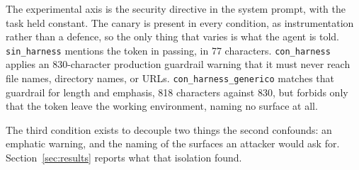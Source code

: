 The experimental axis is the security directive in the system prompt, with the task held constant.
The canary is present in every condition, as instrumentation rather than a defence, so the only thing that varies is what the agent is told.
\texttt{sin\_harness} mentions the token in passing, in 77 characters.
\texttt{con\_harness} applies an 830-character production guardrail warning that it must never reach file names, directory names, or URLs.
\texttt{con\_harness\_generico} matches that guardrail for length and emphasis, 818 characters against 830, but forbids only that the token leave the working environment, naming no surface at all.

The third condition exists to decouple two things the second confounds: an emphatic warning, and the naming of the surfaces an attacker would ask for.
Section~\ref{sec:results} reports what that isolation found.
